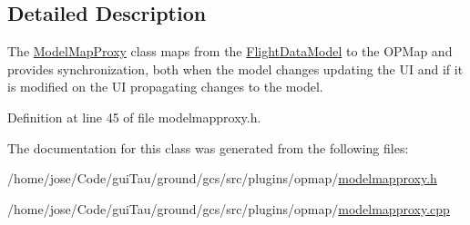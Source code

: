 \subsection{Detailed Description}
The \hyperlink{class_model_map_proxy}{Model\-Map\-Proxy} class maps from the \hyperlink{class_flight_data_model}{Flight\-Data\-Model} to the O\-P\-Map and provides synchronization, both when the model changes updating the U\-I and if it is modified on the U\-I propagating changes to the model. 

Definition at line 45 of file modelmapproxy.\-h.



The documentation for this class was generated from the following files\-:\begin{DoxyCompactItemize}
\item 
/home/jose/\-Code/gui\-Tau/ground/gcs/src/plugins/opmap/\hyperlink{modelmapproxy_8h}{modelmapproxy.\-h}\item 
/home/jose/\-Code/gui\-Tau/ground/gcs/src/plugins/opmap/\hyperlink{modelmapproxy_8cpp}{modelmapproxy.\-cpp}\end{DoxyCompactItemize}
